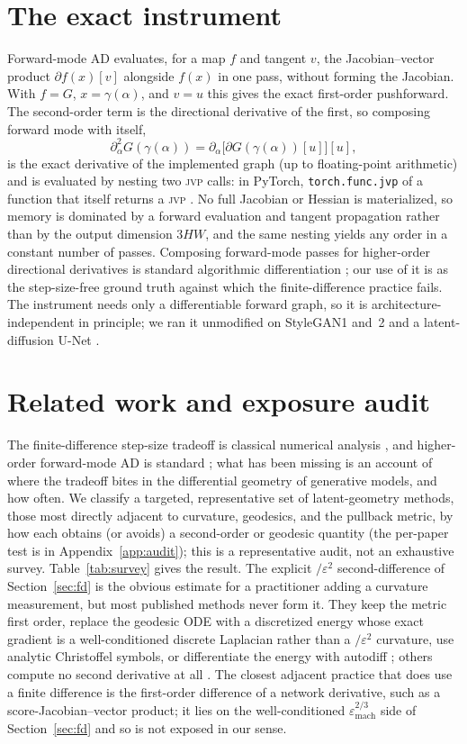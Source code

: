 \documentclass[10pt]{article} %
\newcommand{\jvp}{\textsc{jvp}}
\newcommand{\eps}{\varepsilon}
\begin{document}
\section{The exact instrument}
\label{sec:method}
Forward-mode AD evaluates, for a map $f$ and tangent $v$, the Jacobian--vector
product $\partial f(x)[v]$ alongside $f(x)$ in one pass, without forming the
Jacobian. With $f=G$, $x=\gamma(\alpha)$, and $v=u$ this gives the exact
first-order pushforward. The second-order term is the directional derivative of
the first, so composing forward mode with itself,
\[
\partial^2_\alpha G(\gamma(\alpha))=\partial_\alpha\big[\partial
G(\gamma(\alpha))[u]\big][u],
\]
is the exact derivative of the implemented graph (up to floating-point arithmetic)
and is evaluated by nesting two \jvp{} calls: in PyTorch, \texttt{torch.func.jvp}
of a function that itself returns a \jvp{} \citep{paszke2019}. No full Jacobian or
Hessian is materialized, so memory is dominated by a forward evaluation and tangent
propagation rather than by the output dimension $3HW$, and the same nesting yields
any order in a constant number of passes. Composing forward-mode passes for
higher-order directional derivatives is standard algorithmic differentiation
\citep{griewank2008}; our use of it is as the step-size-free ground truth against
which the finite-difference practice fails. The instrument needs only a
differentiable forward graph, so it is architecture-independent in principle; we ran
it unmodified on StyleGAN1 and~2 \citep{karras2019,karras2020} and a latent-diffusion
U-Net \citep{rombach2022}.

\section{Related work and exposure audit}
\label{sec:survey}
The finite-difference step-size tradeoff is classical numerical analysis
\citep{press2007}, and higher-order forward-mode AD is standard
\citep{griewank2008}; what has been missing is an account of where the tradeoff
bites in the differential geometry of generative models, and how often. We classify
a targeted, representative set of latent-geometry methods, those most directly
adjacent to curvature, geodesics, and the pullback metric, by how each obtains (or
avoids) a second-order or geodesic quantity (the per-paper test is in
Appendix~\ref{app:audit}); this is a representative audit, not an exhaustive survey.
Table~\ref{tab:survey} gives the result. The explicit $/\eps^2$ second-difference of
Section~\ref{sec:fd} is the obvious estimate for a practitioner adding a curvature
measurement, but most published methods never form it. They keep the metric first
order, replace the geodesic ODE with a discretized energy whose exact gradient is a
well-conditioned discrete Laplacian rather than a $/\eps^2$ curvature, use analytic
Christoffel symbols, or differentiate the energy with autodiff \citep{yang2018};
others compute no second derivative at all \citep{park2023,chen2018,kwon2023}. The
closest adjacent practice that does use a finite difference is the first-order
difference of a network derivative, such as a score-Jacobian--vector product; it
lies on the well-conditioned $\eps_{\mathrm{mach}}^{2/3}$ side of
Section~\ref{sec:fd} and so is not exposed in our sense.
\end{document}
